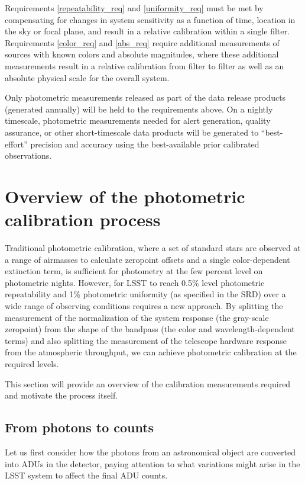 \documentclass[12pt,preprint]{aastex}
\begin{document}
Requirements \ref{repeatability_req} and \ref{uniformity_req} must be
met by compensating for changes in system sensitivity as a function of
time, location in the sky or focal plane, and result in a relative
calibration within a single filter. Requirements \ref{color_req}
and \ref{abs_req} require additional measurements of sources with
known colors and absolute magnitudes, where these additional
measurements result in a relative calibration from filter to filter as
well as an absolute physical scale for the overall system.

Only photometric measurements released as part of the data release
products (generated annually) will be held to the requirements
above. On a nightly timescale, photometric measurements needed for
alert generation, quality assurance, or other short-timescale data
products will be generated to ``best-effort'' precision and accuracy
using the best-available prior calibrated observations.

\section{Overview of the photometric calibration process}

Traditional photometric calibration, where a set of standard stars are
observed at a range of airmasses to calculate zeropoint offsets and a
single color-dependent extinction term, is sufficient for photometry
at the few percent level on photometric nights. However, for LSST to
reach 0.5\% level photometric repeatability and 1\% photometric
uniformity (as specified in the SRD) over a wide range
of observing conditions requires a new approach. By splitting the
measurement of the normalization of the system response (the
gray-scale zeropoint) from the shape of the bandpass (the color and
wavelength-dependent terms) and also splitting the measurement
of the telescope hardware response from the atmospheric throughput, we
can achieve photometric calibration at the required levels. 

This section will provide an overview of the calibration measurements
required and motivate the process itself. 

\subsection{From photons to counts}

Let us first consider how the photons from an astronomical object are
converted into ADUs in the detector, paying attention to
what variations might arise in the LSST system to affect the final ADU
counts.
\end{document}
